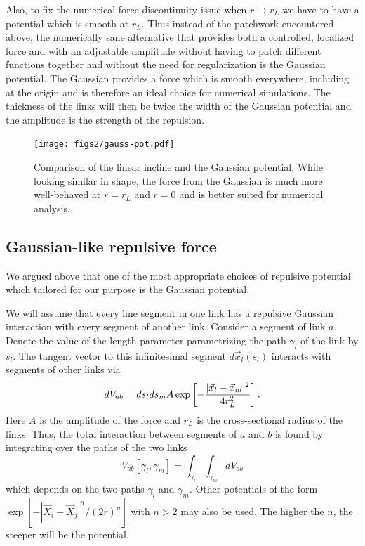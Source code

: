 \documentclass[nofootinbib,preprint,floatfix,titlepage,superscriptaddress]{revtex4} %
\begin{document}
Also, to fix the numerical force discontinuity issue when $r\to r_L$ we have to have a potential which is smooth at $r_L$. Thus instead of the patchwork encountered above, the numerically  sane 
alternative that provides both a controlled, localized force and with an adjustable amplitude without having to patch different functions together and without the need for regularization is the Gaussian potential. 
The Gaussian provides a force which is smooth everywhere, including at the origin and is therefore an ideal choice for numerical simulations. 
The thickness of the links will then be twice the width of the Gaussian potential and the amplitude is the strength of the repulsion.  

\begin{figure}
    \centering
    \texttt{[image: figs2/gauss-pot.pdf]}
    \caption{Comparison of the linear incline and the Gaussian potential. While looking similar in shape, the force from the Gaussian is much more well-behaved at $r= r_L$ and $r=0$ and is better suited for numerical analysis. }
    \label{fig:gauss}
\end{figure}

\subsection{Gaussian-like repulsive force}
We argued above
that one of the most appropriate choices of repulsive potential which tailored for our purpose is the Gaussian potential. 

We will assume that every line segment in one link has a repulsive Gaussian interaction with every segment of another link. Consider a segment of link $a$. Denote the value of the length parameter parametrizing the path $\gamma_l$ of the link by $s_l$. The tangent vector to this infinitesimal segment $d\vec{x}_l(s_l)$ interacts with segments of other links via
\begin{equation}
dV_{ab} = %
ds_lds_m
A \exp\left[- {|\vec{x}_l-\vec{x}_m|^2 \over 4 r_L^2}\right]\label{eq:dVij}.
\end{equation}
Here $A$ is the amplitude of the force and $r_L$ is the cross-sectional radius of the links.
Thus, the total interaction between segments of $a$ and $b$ is found by integrating over the paths of the two links
\begin{equation}
V_{ab}[\gamma_l,\gamma_m] = \int_{\gamma_l} \int_{\gamma_m} dV_{ab} \label{eq:Vij}
\end{equation}
which depends on the two paths $\gamma_l$ and $\gamma_m$.  
Other potentials of the form $\exp[-|\vec{X}_i-\vec{X}_j|^n/(2r)^n]$ with $n>2$ may also be used. The higher the $n$, the steeper will be the potential.
\end{document}
